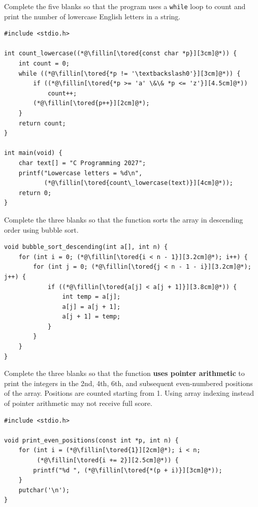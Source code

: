 \documentclass[12pt,a4paper,answers,addpoints]{exam}
\begin{document}
\begin{questions}
\newpage
{}

\question[10] Complete the five blanks so that the program uses a \texttt{while}
loop to count and print the number of lowercase English letters in a string. 
\begin{lstlisting}[style=examc]
#include <stdio.h>

int count_lowercase((*@\fillin[\tored{const char *p}][3cm]@*)) {
    int count = 0;
    while ((*@\fillin[\tored{*p != '\textbackslash0'}][3cm]@*)) {
        if ((*@\fillin[\tored{*p >= 'a' \&\& *p <= 'z'}][4.5cm]@*))
            count++;
        (*@\fillin[\tored{p++}][2cm]@*);
    }
    return count;
}

int main(void) {
    char text[] = "C Programming 2027";
    printf("Lowercase letters = %d\n",
           (*@\fillin[\tored{count\_lowercase(text)}][4cm]@*));
    return 0;
}
\end{lstlisting}

\question[10] Complete the three blanks so that the function sorts the array in
descending order using bubble sort. 
\begin{lstlisting}[style=examc]
void bubble_sort_descending(int a[], int n) {
    for (int i = 0; (*@\fillin[\tored{i < n - 1}][3.2cm]@*); i++) {
        for (int j = 0; (*@\fillin[\tored{j < n - 1 - i}][3.2cm]@*); j++) {
            if ((*@\fillin[\tored{a[j] < a[j + 1]}][3.8cm]@*)) {
                int temp = a[j];
                a[j] = a[j + 1];
                a[j + 1] = temp;
            }
        }
    }
}
\end{lstlisting}

\newpage
\question[10] Complete the three blanks so that the function \textbf{uses pointer
arithmetic} to print the integers in the 2nd, 4th, 6th, and subsequent even-numbered
positions of the array. Positions are counted starting from 1. 
{\color{red}Using array indexing instead of pointer arithmetic may not receive full score.}
\begin{lstlisting}[style=examc]
#include <stdio.h>

void print_even_positions(const int *p, int n) {
    for (int i = (*@\fillin[\tored{1}][2cm]@*); i < n;
         (*@\fillin[\tored{i += 2}][2.5cm]@*)) {
        printf("%d ", (*@\fillin[\tored{*(p + i)}][3cm]@*));
    }
    putchar('\n');
}


\end{lstlisting}
\end{questions}
\end{document}
